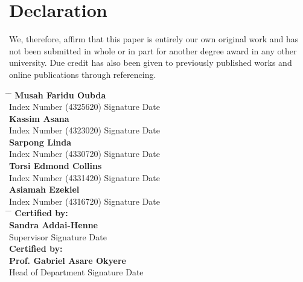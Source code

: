 \documentclass[doublespacing,12pt]{report}
\begin{document}

\chapter*{Declaration}



We, therefore, affirm that this paper is entirely our own original work and has not been submitted in whole or in part for another degree award in any other university. Due credit has also been given to previously published works and online publications through referencing. 
\vspace{0.1in}

\newpage
\begin{tabbing}
    \hspace{6cm} \= \hspace{4cm} \= \hspace{5cm} \kill
    \textbf{Musah Faridu Oubda} \> \makebox[3cm]{\dotfill} \> \makebox[3cm]{\dotfill} \\
    {Index Number (4325620)} \> {Signature} \> {Date} \\[1.5cm]
    \textbf{Kassim Asana} \> \makebox[3cm]{\dotfill} \> \makebox[3cm]{\dotfill} \\
    {Index Number (4323020)} \> {Signature} \> {Date} \\[1.5cm]
    \textbf{Sarpong Linda} \> \makebox[3cm]{\dotfill} \> \makebox[3cm]{\dotfill} \\
    {Index Number (4330720)} \> {Signature} \> {Date} \\[1.5cm]
    \textbf{Torsi Edmond Collins} \> \makebox[3cm]{\dotfill} \> \makebox[3cm]{\dotfill} \\
    {Index Number (4331420)} \> {Signature} \> {Date} \\[1.5cm]
    \textbf{Asiamah Ezekiel} \> \makebox[3cm]{\dotfill} \> \makebox[3cm]{\dotfill} \\
    {Index Number (4316720)} \> {Signature} \> {Date} \\[1.5cm]
    \hspace{6cm} \= \hspace{4cm} \= \hspace{5cm} \kill
    \textbf{Certified by:}\\ 
    \textbf{Sandra Addai-Henne} \> \makebox[3cm]{\dotfill} \> \makebox[3cm]{\dotfill} \\
    {Supervisor} \> {Signature} \> {Date} \\[1.5cm]
    \textbf{Certified by:}\\ 
    \textbf{Prof. Gabriel Asare Okyere} \> \makebox[3cm]{\dotfill} \> \makebox[3cm]{\dotfill} \\
    {Head of Department} \> {Signature} \> {Date}
\end{tabbing}
\end{document}
